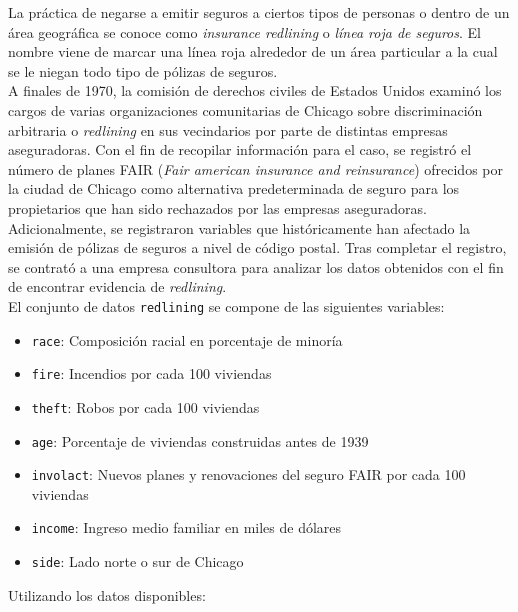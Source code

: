 
\addpoints
\question La práctica de negarse a emitir seguros a ciertos tipos de personas o dentro de un área geográfica se conoce como \textit{insurance redlining} o \textit{línea roja de seguros}. El nombre viene de marcar una línea roja alrededor de un área particular a la cual se le niegan todo tipo de pólizas de seguros.\\

A finales de 1970, la comisión de derechos civiles de Estados Unidos examinó los cargos de varias organizaciones comunitarias de Chicago sobre discriminación arbitraria o \textit{redlining} en sus vecindarios por parte de distintas empresas aseguradoras. Con el fin de recopilar información para el caso, se registró el número de planes FAIR (\textit{Fair american insurance and reinsurance}) ofrecidos por la ciudad de Chicago como alternativa predeterminada de seguro para los propietarios que han sido rechazados por las empresas aseguradoras. Adicionalmente, se registraron variables que históricamente han afectado la emisión de pólizas de seguros a nivel de código postal. Tras completar el registro, se contrató a una empresa consultora para analizar los datos obtenidos con el fin de encontrar evidencia de \textit{redlining}.\\

El conjunto de datos \texttt{redlining} se compone de las siguientes variables:

\begin{itemize}
\item \texttt{race}: Composición racial en porcentaje de minoría
\item \texttt{fire}: Incendios por cada 100 viviendas
\item \texttt{theft}: Robos por cada 100 viviendas
\item \texttt{age}: Porcentaje de viviendas construidas antes de 1939
\item \texttt{involact}: Nuevos planes y renovaciones del seguro FAIR por cada 100 viviendas
\item \texttt{income}: Ingreso medio familiar en miles de dólares
\item \texttt{side}: Lado norte o sur de Chicago
\end{itemize}
Utilizando los datos disponibles:

